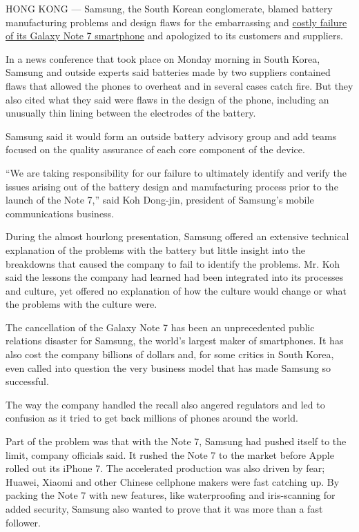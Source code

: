 HONG KONG --- Samsung, the South Korean conglomerate, blamed battery
manufacturing problems and design flaws for the embarrassing and
\href{https://www.nytimes.com/2016/10/12/business/international/samsung-galaxy-note7-terminated.html?_r=0}{costly
failure of its Galaxy Note 7 smartphone} and apologized to its customers
and suppliers.

In a news conference that took place on Monday morning in South Korea,
Samsung and outside experts said batteries made by two suppliers
contained flaws that allowed the phones to overheat and in several cases
catch fire. But they also cited what they said were flaws in the design
of the phone, including an unusually thin lining between the electrodes
of the battery.

Samsung said it would form an outside battery advisory group and add
teams focused on the quality assurance of each core component of the
device.

``We are taking responsibility for our failure to ultimately identify
and verify the issues arising out of the battery design and
manufacturing process prior to the launch of the Note 7,'' said Koh
Dong-jin, president of Samsung's mobile communications business.

During the almost hourlong presentation, Samsung offered an extensive
technical explanation of the problems with the battery but little
insight into the breakdowns that caused the company to fail to identify
the problems. Mr. Koh said the lessons the company had learned had been
integrated into its processes and culture, yet offered no explanation of
how the culture would change or what the problems with the culture were.

The cancellation of the Galaxy Note 7 has been an unprecedented public
relations disaster for Samsung, the world's largest maker of
smartphones. It has also cost the company billions of dollars and, for
some critics in South Korea, even called into question the very business
model that has made Samsung so successful.

The way the company handled the recall also angered regulators and led
to confusion as it tried to get back millions of phones around the
world.

Part of the problem was that with the Note 7, Samsung had pushed itself
to the limit, company officials said. It rushed the Note 7 to the market
before Apple rolled out its iPhone 7. The accelerated production was
also driven by fear; Huawei, Xiaomi and other Chinese cellphone makers
were fast catching up. By packing the Note 7 with new features, like
waterproofing and iris-scanning for added security, Samsung also wanted
to prove that it was more than a fast follower.

